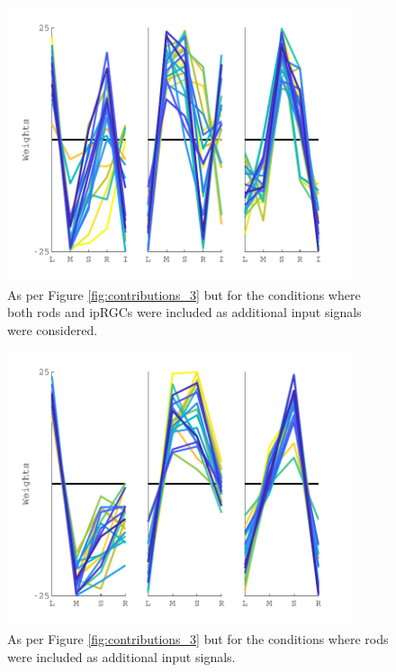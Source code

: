 \begin{figure}[htbp]
\includegraphics[max width=0.9\textwidth]{figs/LargeSphere/contributions_5.pdf}
\caption{As per Figure \ref{fig:contributions_3} but for the conditions where both rods and ipRGCs were included as additional input signals were considered.} 
\label{fig:contributions_5}
\end{figure}

\begin{figure}[htbp]
\includegraphics[max width=0.9\textwidth]{figs/LargeSphere/contributions_4.pdf}
\caption{As per Figure \ref{fig:contributions_3} but for the conditions where rods were included as additional input signals.} 
\label{fig:contributions_4}
\end{figure}

